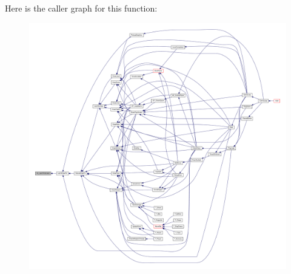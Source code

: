 Here is the caller graph for this function:
\nopagebreak
\begin{figure}[H]
\begin{center}
\leavevmode
\includegraphics[width=400pt]{ID__VL_8C_a80443116a2a895fc294adfe9b2220819_icgraph}
\end{center}
\end{figure}


